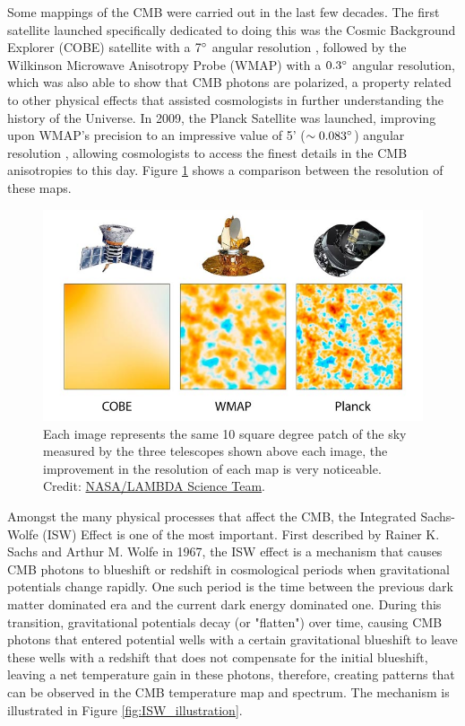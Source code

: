 \documentclass[openany,a4paper,12pt,oneside]{book}
\begin{document}
\begin{spacing}{1.5}
Some mappings of the CMB were carried out in the last few decades. The first satellite launched specifically dedicated to doing this was the Cosmic Background Explorer (COBE) satellite with a $7\degree$ angular resolution \cite{COBE}, followed by the Wilkinson Microwave Anisotropy Probe (WMAP) with a $0.3\degree$ angular resolution, which was also able to show that CMB photons are polarized, a property related to other physical effects that assisted cosmologists in further understanding the history of the Universe\cite{polarization_1997, polarization_2014, BMode_constraints}. In 2009, the Planck Satellite was launched, improving upon WMAP's precision to an impressive value of 5' ($\sim 0.083\degree$) angular resolution \cite{theplanckcollaboration2006scientific}, allowing cosmologists to access the finest details in the CMB anisotropies to this day. Figure \ref{fig:cmb_satellites} shows a comparison between the resolution of these maps.

\begin{figure}
    \centering
    \includegraphics[width=.9\linewidth]{Imagens/satellites.jpg}
    \caption{Each image represents the same 10 square degree patch of the sky measured by the three telescopes shown above each image, the improvement in the resolution of each map is very noticeable. Credit: \href{https://lambda.gsfc.nasa.gov/education/graphic_history/microwaves.html}{NASA/LAMBDA Science Team}.}
    \label{fig:cmb_satellites}
\end{figure}

Amongst the many physical processes that affect the CMB, the Integrated Sachs-Wolfe (ISW) Effect is one of the most important. First described by Rainer K. Sachs and Arthur M. Wolfe in 1967, the ISW effect is a mechanism that causes CMB photons to blueshift or redshift in cosmological periods when gravitational potentials change rapidly. One such period is the time between the previous dark matter dominated era and the current dark energy dominated one. During this transition, gravitational potentials decay (or "flatten") over time, causing CMB photons that entered potential wells with a certain gravitational blueshift to leave these wells with a redshift that does not compensate for the initial blueshift, leaving a net temperature gain in these photons, therefore, creating patterns that can be observed in the CMB temperature map and spectrum\cite{Sachs:1967er}. The mechanism is illustrated in Figure \ref{fig:ISW_illustration}.


\end{spacing}
\end{document}
